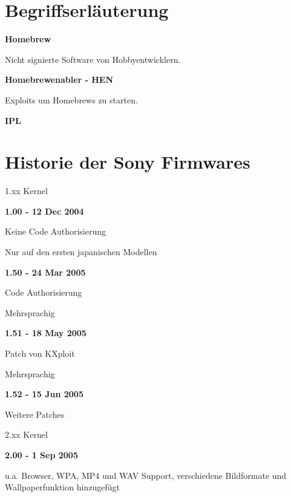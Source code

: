 \documentclass[mode=print,paper=screen,style=jefka]{powerdot}
\begin{document}
\section{Begriffserläuterung}
\begin{slide}{}
	\begin{LARGE}\textbf{Homebrew}\end{LARGE}\linebreak
	Nicht signierte Software von Hobbyentwicklern.\linebreak
	\linebreak
	\begin{LARGE}\textbf{Homebrewenabler - HEN}\end{LARGE}\linebreak
	Exploits um Homebrews zu starten.\linebreak
	\linebreak
	\begin{LARGE}\textbf{IPL}\end{LARGE}\linebreak

\end{slide}



\section{Historie der Sony Firmwares}
\begin{slide}{1.xx Kernel}
	\begin{LARGE}\textbf{1.00 - 12 Dec 2004}\end{LARGE}
	\begin{list}{-}{}
		\item{Keine Code Authorisierung}
		\item{Nur auf den ersten japanischen Modellen}
	\end{list}
	\begin{LARGE}\textbf{1.50 - 24 Mar 2005}\end{LARGE}
	\begin{list}{-}{}
		\item{Code Authorisierung}
		\item{Mehrsprachig}
	\end{list}
	\begin{LARGE}\textbf{1.51 - 18 May 2005}\end{LARGE}
	\begin{list}{-}{}
		\item{Patch von KXploit}
		\item{Mehrsprachig}
	\end{list}
	\begin{LARGE}\textbf{1.52 - 15 Jun 2005}\end{LARGE}
	\begin{list}{-}{}
		\item{Weitere Patches}
	\end{list}
\end{slide}

\begin{slide}{2.xx Kernel}
	\begin{LARGE}\textbf{2.00 - 1 Sep 2005}\end{LARGE}
	\begin{list}{-}{}
		\item{u.a. Browser, WPA, MP4 und WAV Support, verschiedene Bildformate und Wallpaperfunktion hinzugefügt}
	\end{list}
\end{slide}
\end{document}

